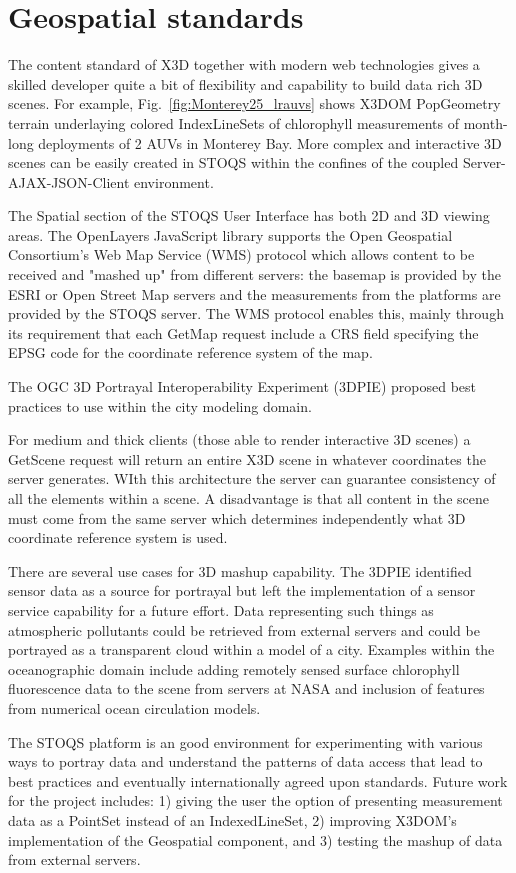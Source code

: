 \documentclass[annualconference]{acmsiggraph}  %
\begin{document}


\section{Geospatial standards}
The content standard of X3D together with modern web technologies gives a skilled developer quite a bit of flexibility and capability to build data rich 3D scenes.  For example, 
Fig.~\ref{fig:Monterey25_lrauvs} shows X3DOM PopGeometry terrain underlaying colored IndexLineSets of chlorophyll measurements of month-long deployments of 2 AUVs in Monterey Bay. 
More complex and interactive 3D scenes can be easily created in STOQS within the confines of the coupled Server-AJAX-JSON-Client environment. 

The Spatial section of the STOQS User Interface has both 2D and 3D viewing areas. The OpenLayers JavaScript library supports the Open Geospatial Consortium's Web Map Service (WMS) protocol which allows content to be received and "mashed up" from different servers: the basemap is provided by the ESRI or Open Street Map servers and the measurements from the platforms are provided by the STOQS server. The WMS protocol enables this, mainly through its requirement that each GetMap request include a CRS field specifying the EPSG code for the coordinate reference system of the map.


The OGC 3D Portrayal Interoperability Experiment (3DPIE) \cite{3DPIE} proposed best practices to use within the city modeling domain.  

For medium and thick clients (those able to render interactive 3D scenes) a GetScene request will return an entire X3D scene in whatever coordinates the server generates. WIth this architecture the server can guarantee consistency of all the elements within a scene. A disadvantage is that all content in the scene must come from the same server which determines independently what 3D coordinate reference system is used.

There are several use cases for 3D mashup capability. The 3DPIE identified sensor data as a source for portrayal but left the implementation of a sensor service capability for a future effort. Data representing such things as atmospheric pollutants could be retrieved from external servers and could be portrayed as a transparent cloud within a model of a city. Examples within the oceanographic domain include adding remotely sensed surface chlorophyll fluorescence data to the scene from servers at NASA and inclusion of features from numerical ocean circulation models. 

The STOQS platform is an good environment for experimenting with various ways to portray data and understand the patterns of data access that lead to best practices and eventually internationally agreed upon standards. Future work for the project includes: 1) giving the user the option of presenting measurement data as a PointSet instead of an IndexedLineSet, 2) improving X3DOM's implementation of the Geospatial component, and 3) testing the mashup of data from external servers.





\nocite{*}

\end{document}
